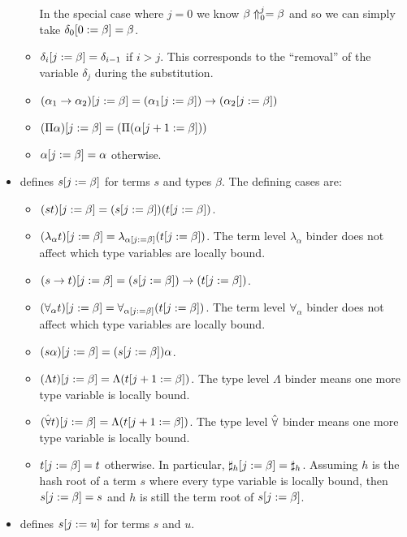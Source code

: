 \begin{itemize}
\begin{itemize}
In the special case where $j=0$ we know $\dbtpsh{0}{j}{\beta} = \beta$
and so we can simply take $\dbsub{0}{\beta}{\delta_0} = \beta$.
\item $\dbsub{j}{\beta}{\delta_i} = \delta_{i-1}$ if $i>j$. This corresponds to the ``removal'' of the variable $\delta_j$ during the substitution.
\item $\dbsub{j}{\beta}{(\alpha_1\to\alpha_2)} = (\dbsub{j}{\beta}{\alpha_1})\to (\dbsub{j}{\beta}{\alpha_2})$
\item $\dbsub{j}{\beta}{(\Pi \alpha)} = (\Pi (\dbsub{j+1}{\beta}{\alpha}))$
\item $\dbsub{j}{\beta}{\alpha} = \alpha$ otherwise.
\end{itemize}
\item {} defines $\dbsub{j}{\beta}{s}$ for terms $s$ and types $\beta$.
The defining cases are:
\begin{itemize}
\item $\dbsub{j}{\beta}{(st)} = (\dbsub{j}{\beta}{s}) (\dbsub{j}{\beta}{t})$.
\item $\dbsub{j}{\beta}{(\lambda_\alpha t)} = \lambda_{\dbsub{j}{\beta}{\alpha}} (\dbsub{j}{\beta}{t})$. The term level $\lambda_\alpha$ binder does not affect which type variables are locally bound.
\item $\dbsub{j}{\beta}{(s\to t)} = (\dbsub{j}{\beta}{s}) \to (\dbsub{j}{\beta}{t})$.
\item $\dbsub{j}{\beta}{(\forall_\alpha t)} = \forall_{\dbsub{j}{\beta}\alpha} (\dbsub{j}{\beta}{t})$. The term level $\forall_\alpha$ binder does not affect which type variables are locally bound.
\item $\dbsub{j}{\beta}{(s\alpha)} = (\dbsub{j}{\beta}{s}) \alpha$.
\item $\dbsub{j}{\beta}{(\Lambda t)} = \Lambda (\dbsub{j+1}{\beta}{t})$. The type level $\Lambda$ binder means one more type variable is locally bound.
\item $\dbsub{j}{\beta}{(\tforall t)} = \Lambda (\dbsub{j+1}{\beta}{t})$. The type level $\tforall$ binder means one more type variable is locally bound.
\item $\dbsub{j}{\beta}{t} = t$ otherwise. In particular, $\dbsub{j}{\beta}{\tmh{h}} = \tmh{h}$.
Assuming $h$ is the hash root of a term $s$ where every type variable is locally bound,
then $\dbsub{j}{\beta}{s} = s$
and $h$ is still the term root of $\dbsub{j}{\beta}{s}$.
\end{itemize}
\item {} defines $\dbsub{j}{u}{s}$ for terms $s$ and $u$.

\end{itemize}
